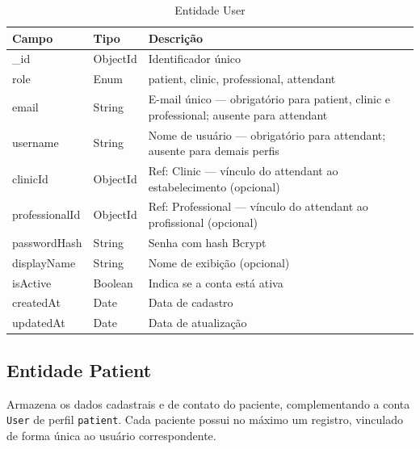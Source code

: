 \begin{table}[H]
  \centering
  \caption{Entidade User}
  \label{tab:entity-user}
  \begin{tabular}{p{3.8cm}p{2.5cm}p{5.2cm}}
    \toprule
    \textbf{Campo} &
    \textbf{Tipo} &
    \textbf{Descrição} \\
    \midrule
    \_id           & ObjectId & Identificador único \\
    role           & Enum     & patient, clinic,
                                professional, attendant \\
    email          & String   & E-mail único ---
                                obrigatório para patient,
                                clinic e professional;
                                ausente para attendant \\
    username       & String   & Nome de usuário ---
                                obrigatório para attendant;
                                ausente para demais perfis \\
    clinicId       & ObjectId & Ref: Clinic --- vínculo do
                                attendant ao estabelecimento (opcional) \\
    professionalId & ObjectId & Ref: Professional --- vínculo do
                                attendant ao profissional (opcional) \\
    passwordHash   & String   & Senha com hash Bcrypt \\
    displayName    & String   & Nome de exibição (opcional) \\
    isActive       & Boolean  & Indica se a conta está ativa \\
    createdAt      & Date     & Data de cadastro \\
    updatedAt      & Date     & Data de atualização \\
    \bottomrule
  \end{tabular}
\end{table}

\subsection{Entidade Patient}
\label{subsec:entity-patient}

Armazena os dados cadastrais e de contato do
paciente, complementando a conta \texttt{User} de
perfil \texttt{patient}. Cada paciente possui no
máximo um registro, vinculado de forma única ao
usuário correspondente.

